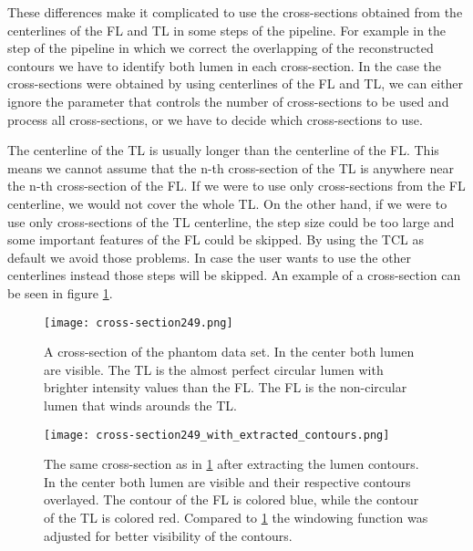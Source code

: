 \documentclass[thesis.tex]{subfiles}
\begin{document}
These differences make it complicated to use the cross-sections obtained from the centerlines of the FL and TL in some steps of the pipeline. For example in the step of the pipeline in which we correct the overlapping of the reconstructed contours we have to identify both lumen in each cross-section. In the case the cross-sections were obtained by using centerlines of the FL and TL, we can either ignore the parameter that controls the number of cross-sections to be used and process all cross-sections, or we have to decide which cross-sections to use.

The centerline of the TL is usually longer than the centerline of the FL. This means we cannot assume that the n-th cross-section of the TL is anywhere near the n-th cross-section of the FL. If we were to use only cross-sections from the FL centerline, we would not cover the whole TL. On the other hand, if we were to use only cross-sections of the TL centerline, the step size could be too large and some important features of the FL could be skipped. By using the TCL as default we avoid those problems. In case the user wants to use the other centerlines instead those steps will be skipped. An example of a cross-section can be seen in figure \ref{fig:cross-section}.

\begin{figure}[h]
\centering
\texttt{[image: cross-section249.png]}
\caption{A cross-section of the phantom data set. In the center both lumen are visible. The TL is the almost perfect circular lumen with brighter intensity values than the FL. The FL is the non-circular lumen that winds arounds the TL.}
\label{fig:cross-section}
\end{figure}  

\begin{figure}[h]
\centering
\texttt{[image: cross-section249\_with\_extracted\_contours.png]}
\caption{The same cross-section as in \ref{fig:cross-section} after extracting the lumen contours. In the center both lumen are visible and their respective contours overlayed. The contour of the FL is colored blue, while the contour of the TL is colored red. Compared to \ref{fig:cross-section} the windowing function was adjusted for better visibility of the contours.}
\label{fig:extracted_contours}
\end{figure} 
\end{document}

